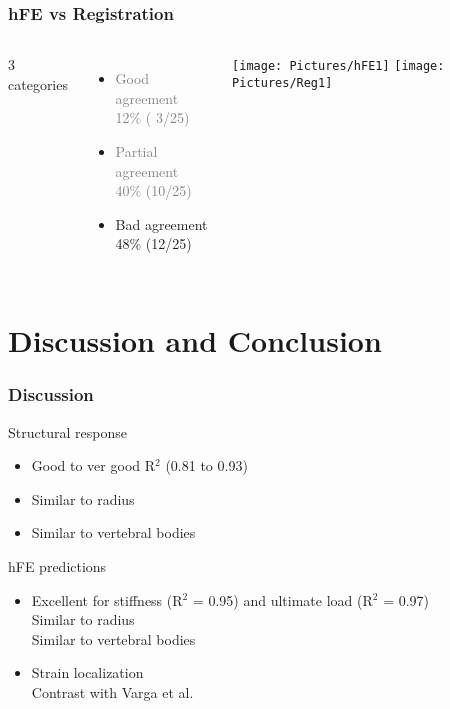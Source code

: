 \documentclass[xcolor=table,11pt]{beamer}
\begin{document}
	\begin{frame}[noframenumbering]
		\frametitle{hFE vs Registration}
		\centering
		\vspace{2mm}
		\begin{columns}
			\vfill
			3 categories\\
			\vfill
			\begin{itemize}
				\item \textcolor{gray}{Good agreement\\12\% ( 3/25)}
				\item \textcolor{gray}{Partial agreement\\40\% (10/25)}
				\item Bad agreement\\48\% (12/25)
			\end{itemize}
			\vfill

			\centering
			\texttt{[image: Pictures/hFE1]}\vspace{5mm}
			\texttt{[image: Pictures/Reg1]}
		\end{columns}
	\end{frame}

	
	\section{Discussion and Conclusion}

	\begin{frame}
		\frametitle{Discussion}

		Structural response
		\begin{itemize}
			\item Good to ver good R$^2$ (0.81 to 0.93)
			\item Similar to radius \cite{p8}\cite{p9}
			\item Similar to vertebral bodies \cite{p10}\cite{p11}
		\end{itemize}

		\vfill

		hFE predictions
		\begin{itemize}
			\item Excellent for stiffness (R$^2$ = 0.95) and ultimate load (R$^2$ = 0.97)\\Similar to radius\cite{p9}\\Similar to vertebral bodies\cite{p10}
			\item Strain localization\\Contrast with Varga et al. \cite{p7}
		\end{itemize}

	\end{frame}
	
\end{document}
